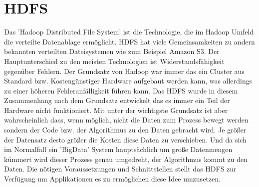 \documentclass[12pt,oneside,a4paper,parskip]{scrbook}
\begin{document}
\section{HDFS}
Das 'Hadoop Distributed File System' ist die Technologie, die im Hadoop Umfeld die verteilte Datenablage erm\"oglicht. HDFS hat viele Gemeinsamkeiten zu andern bekannten verteilten Dateisystemen wie zum Beispiel Amazon S3. Der Hauptunterschied zu den meisten Technologien ist Widerstandsf\"ahigkeit gegen\"uber Fehlern. Der Grundsatz von Hadoop war immer das ein Cluster aus Standard bzw. Kosteng\"unstiger Hardware aufgebaut werden kann, was allerdings zu einer h\"oheren Fehleranf\"alligkeit f\"uhren kann. Das HDFS wurde in diesem Zusammenhang nach dem Grundsatz entwickelt das es immer ein Teil der Hardware nicht funktioniert.\cite{hdfsFailure} \newline
Mit unter der wichtigste Grundsatz ist aber wahrscheinlich dass, wenn m\"oglich, nicht die Daten zum Prozess bewegt werden sondern der Code bzw. der Algorithmus zu den Daten gebracht wird.\cite{movingComputation} Je gr\"oßer der Datensatz desto gr\"oßer die Kosten diese Daten zu verschieben. Und da sich im Normalfall ein 'BigData' System haupts\"achlich um große Datenmengen k\"ummert wird dieser Prozess genau umgedreht, der Algorithmus kommt zu den Daten. Die n\"otigen Voraussetzungen und Schnittstellen stellt das HDFS zur Verf\"ugung um Applikationen es zu erm\"oglichen diese Idee umzusetzen.
\end{document}
